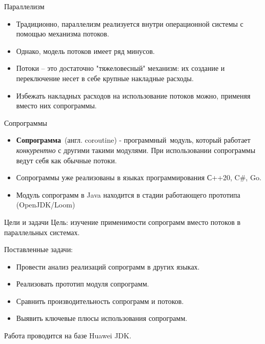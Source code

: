 \begin{frame}{Параллелизм}
	\begin{itemize}
	\item Традиционно, параллелизм реализуется внутри операционной системы с помощью механизма потоков.
	\item Однако, модель потоков имеет ряд минусов. 
	\item Потоки -- это достаточно "тяжеловесный" механизм: их создание и переключение несет в себе крупные накладные расходы. 
	\item Избежать накладных расходов на использование потоков можно, применяя вместо них сопрограммы. 
	\end{itemize}
\end{frame}

\begin{frame}{Сопрограммы}
	\begin{itemize}
		\item \textbf{Сопрограмма} (англ. coroutine) - программный модуль, который работает 
		\textit{конкурентно} с другими такими модулями. При использовании сопрограммы ведут себя как обычные потоки.
		
		\item Сопрограммы уже реализованы в языках программирования С++20, C\#, Go.
		\item Модуль сопрограмм в Java находится в стадии работающего прототипа (OpenJDK/Loom)
	\end{itemize}
\end{frame}

\begin{frame}{Цели и задачи}
	Цель: изучение применимости сопрограмм вместо потоков в параллельных системах.
	\par
	Поставленные задачи:
	\begin{itemize}
		\item Провести анализ реализаций сопрограмм в других языках.
		\item Реализовать прототип модуля сопрограмм.
		\item Сравнить производительность сопрограмм и потоков.
		\item Выявить ключевые плюсы использования сопрограмм.
	\end{itemize}
	Работа проводится на базе Huawei JDK.
\end{frame} 

